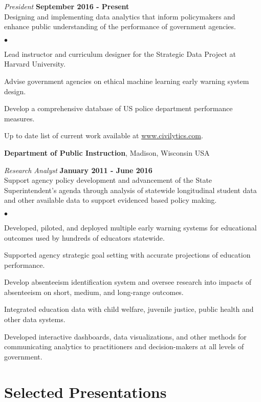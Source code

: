 \documentclass[margin,line]{res}
\newenvironment{list2}{
  \begin{list}{$\bullet$}{%
      \setlength{\itemsep}{0in}
      \setlength{\parsep}{0in} \setlength{\parskip}{0in}
      \setlength{\topsep}{0in} \setlength{\partopsep}{0in} 
      \setlength{\leftmargin}{0.2in}}}{\end{list}}
\begin{document}
\begin{resume}
\vspace{-.3cm}
{\em President} \hfill {\bf September 2016 - Present}\\
Designing and implementing data analytics that inform policymakers and enhance 
public understanding of the performance of government agencies.\\
\vspace{-2mm}
\begin{list2}
\item Lead instructor and curriculum designer for the Strategic Data Project at Harvard University.
\item Advise government agencies on ethical machine learning early warning system design. 
\item Develop a comprehensive database of US police department performance measures.
\item Up to date list of current work available at \url{www.civilytics.com}.
\end{list2}
\vspace{-.1cm}


{\bf Department of Public Instruction}, Madison, Wisconsin USA

\vspace{-.3cm}
{\em Research Analyst} \hfill {\bf January 2011 - June 2016}\\
Support agency policy development and advancement of the State Superintendent's agenda through analysis of statewide longitudinal student data and other available data to support evidenced based policy making. 
\begin{list2}
\item Developed, piloted, and deployed multiple early warning systems for educational outcomes 
used by hundreds of educators statewide. 
\item Supported agency strategic goal setting with accurate projections of education performance.
\item Develop absenteeism identification system and oversee research into impacts of 
absenteeism on short, medium, and long-range outcomes.
\item Integrated education data with child welfare, juvenile justice, public health and other 
data systems. 
\item Developed interactive dashboards, data visualizations, and other methods for communicating 
analytics to practitioners and decision-makers at all levels of government.
\end{list2}

\section{\sc Selected Presentations}


\end{resume}
\end{document}
